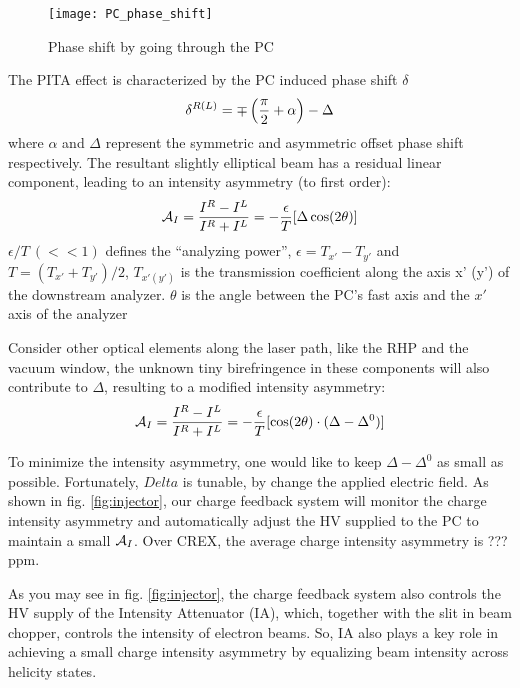 \begin{figure}[h!]
    \centering
    \texttt{[image: PC\_phase\_shift]}
    \caption{Phase shift by going through the PC}
    \label{fig:pc_phase_shift}
\end{figure}

The PITA effect is characterized by the PC induced phase shift $\delta$
\begin{equation*}
    \delta^{R(L)} = \mp\left(\frac{\pi}{2} + \alpha \right) - \Delta \\
\end{equation*}
where $\alpha$ and $\Delta$ represent the symmetric and asymmetric offset phase
shift respectively. The resultant slightly elliptical beam has a residual
linear component, leading to an intensity asymmetry (to first order):
\begin{equation}
    \mathcal{A}_{I} = \frac{I^R - I^L}{I^R + I^L} = -\frac{\epsilon}{T}[\Delta\cos(2\theta)]	\\
\end{equation}
$\epsilon/T \ (<<1)$ defines the ``analyzing power'', $\epsilon = T_{x'} - T_{y'}$ 
and $T = (T_{x'} + T_{y'})/2$,
$T_{x' (y')}$ is the transmission coefficient along the axis x' (y') of the
downstream analyzer. $\theta$ is the angle between the PC's fast axis and the 
$x'$ axis of the analyzer

Consider other optical elements along the laser path, like the RHP and the vacuum
window, the unknown tiny birefringence in these components will also contribute to $\Delta$,
resulting to a modified intensity asymmetry:
\begin{equation}
    \mathcal{A}_{I} = \frac{I^R - I^L}{I^R + I^L} = -\frac{\epsilon}{T}[\cos(2\theta)\cdot(\Delta - \Delta^0)]	\\
\end{equation}

To minimize the intensity asymmetry, one would like to keep $\Delta - \Delta^0$
as small as possible. Fortunately, $Delta$ is tunable, by change the applied
electric field. As shown in fig. \ref{fig:injector}, our charge feedback system
will monitor the charge intensity asymmetry and automatically adjust the HV 
supplied to the PC to maintain a small $\mathcal{A}_I$. Over CREX, the average charge
intensity asymmetry is ??? ppm.

As you may see in fig. \ref{fig:injector}, the charge feedback system also
controls the HV supply of the Intensity Attenuator (IA), which, together with
the slit in beam chopper, controls the intensity of electron beams. So, IA also
plays a key role in achieving a small charge intensity asymmetry by equalizing
beam intensity across helicity states.

